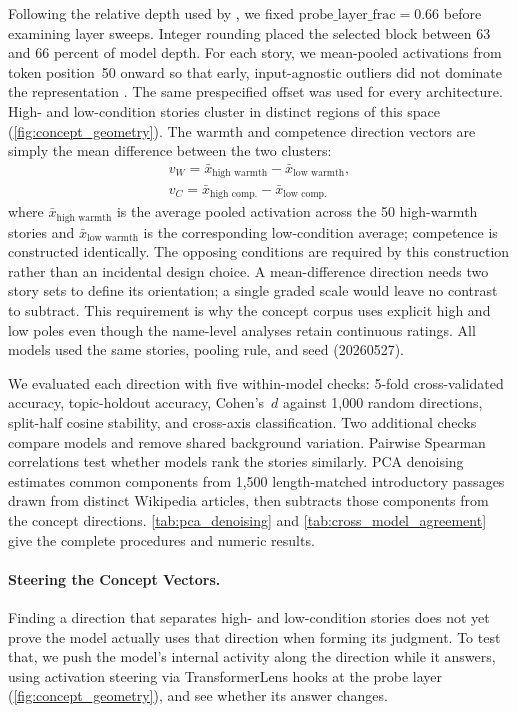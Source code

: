\documentclass[twocolumn]{article}
\begin{document}
Following the relative depth used by \citet{sofroniew2026emotion}, we fixed
$\mathrm{probe\_layer\_frac}=0.66$ before examining layer sweeps. Integer
rounding placed the selected block between 63 and 66 percent of model depth.
For each story, we mean-pooled activations from token position~50 onward so
that early, input-agnostic outliers did not dominate the representation
\citep{sun2024massive, xiao2023streaming}. The same prespecified offset was
used for every architecture.
High- and low-condition stories cluster in distinct regions of this space
(\autoref{fig:concept_geometry}). The warmth and competence direction
vectors are simply the mean difference between the two clusters:
\begin{gather*}
  v_W = \bar{x}_{\text{high warmth}} - \bar{x}_{\text{low warmth}}, \\
  v_C = \bar{x}_{\text{high comp.}} - \bar{x}_{\text{low comp.}}
\end{gather*}
where $\bar{x}_{\text{high warmth}}$ is the average pooled activation
across the 50 high-warmth stories and $\bar{x}_{\text{low warmth}}$ is the
corresponding low-condition average; competence is constructed identically.
The opposing conditions are required by this construction rather than an
incidental design choice. A mean-difference direction needs two story sets to
define its orientation; a single graded scale would leave no contrast to
subtract. This requirement is why the concept corpus uses explicit high and
low poles even though the name-level analyses retain continuous ratings.
All models used the same stories, pooling rule, and seed (20260527).

We evaluated each direction with five within-model checks: 5-fold
cross-validated accuracy, topic-holdout accuracy, Cohen's~$d$ against 1,000
random directions, split-half cosine stability, and cross-axis
classification. Two additional checks compare models and remove shared
background variation. Pairwise Spearman correlations test whether models
rank the stories similarly. PCA denoising estimates common components from
1,500 length-matched introductory passages drawn from distinct Wikipedia
articles, then subtracts those components from the concept directions.
\autoref{tab:pca_denoising} and \autoref{tab:cross_model_agreement}
give the complete procedures and numeric results.

\paragraph{Steering the Concept Vectors.}
Finding a direction that separates high- and low-condition stories does not
yet prove the model actually uses that direction when forming its
judgment. To test that, we push the model's internal activity along the
direction while it answers, using activation steering
\citep{turner2023activation} via TransformerLens hooks at the probe layer
(\autoref{fig:concept_geometry}), and see whether its answer changes.
\end{document}
